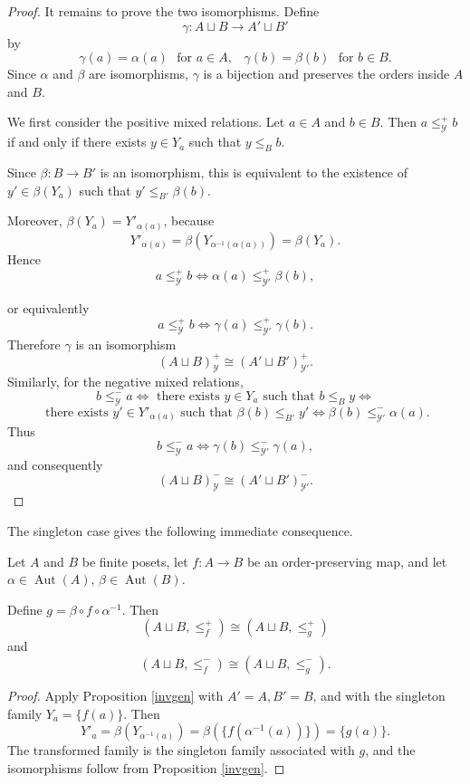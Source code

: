 \begin{proof}
    It remains to prove the two isomorphisms. Define \[\gamma \colon A \sqcup B \to A' \sqcup B'\] by \[\gamma(a)=\alpha(a) \,\, \text{ for } a \in A, \,\,\,\,\, \gamma(b)=\beta(b) \,\, \text{ for } b \in B.\]
    Since $\alpha$ and $\beta$ are isomorphisms, $\gamma$ is a bijection and preserves the orders inside $A$ and $B$. 

    We first consider the positive mixed relations. Let $a \in A$ and $b \in B$. Then $a \leq^+_{\mathcal{Y}}b$ if and only if there exists $y \in Y_a$ such that $y \leq_B b$.

    Since $\beta \colon B \to B'$ is an isomorphism, this is equivalent to the existence of $y' \in \beta( Y_a)$ such that $y' \leq_{B'} \beta(b)$.

    Moreover, $\beta(Y_a)=Y'_{\alpha(a)}$, because \[Y'_{\alpha(a)}=\beta(Y_{\alpha^{-1}(\alpha(a))})=\beta(Y_a).\]
    Hence \[a \leq_{\mathcal{Y}}^+b \iff \alpha(a) \leq^+_{\mathcal{Y}'} \beta(b),\]

    or equivalently \[a \leq^+_{\mathcal{Y}}b \iff \gamma(a) \leq^+_{\mathcal{Y}'} \gamma (b).\]
    Therefore $\gamma$ is an isomorphism 
    \[(A \sqcup B)^+_{\mathcal{Y}} \cong (A' \sqcup B')^+_{\mathcal{Y}'}.\] 
    Similarly, for the negative mixed relations, \[b \leq_{\mathcal{Y}}^-a \iff \text{ there exists } y \in Y_a \text{ such that } b \leq_B y \iff\] \[ \text{ there exists } y' \in Y'_{\alpha(a)} \text{ such that } \beta (b) \leq_{B'} y' \iff \beta (b) \leq^-_{\mathcal{
    Y'}} \alpha(a).\] 
    Thus \[b \leq^-_{\mathcal{
    Y}}a \iff \gamma (b) \leq ^- _{\mathcal{
    Y}'} \gamma (a),\] and consequently \[(A \sqcup B)^-_{\mathcal{Y}} \cong (A' \sqcup B')^-_{\mathcal{Y}'}.\]
\end{proof}

The singleton case gives the following immediate consequence.
\begin{corollary}
    Let $A$ and $B$ be finite posets, let $f \colon A \to B$ be an order-preserving map, and let $\alpha \in \operatorname{Aut}(A)$, $\beta \in \operatorname{Aut}(B)$. 

    Define $g=\beta \circ f \circ \alpha^{-1}$. Then
    \[(A \sqcup B, \leq_f^+)\cong (A \sqcup B, \leq_g^+)\] and 
    \[(A \sqcup B, \leq_f^-) \cong (A \sqcup B, \leq_g^-).\]
\end{corollary}
\begin{proof}
    Apply Proposition \ref{invgen} with $A'=A, B'=B$, and with the singleton family $Y_a=\{f(a)\}$. Then
    \[Y'_a=\beta(Y_{\alpha^{-1}(a)})=\beta(\{f(\alpha^{-1}(a))\})=\{g(a)\}.\] The transformed family is the singleton family associated with $g$, and the isomorphisms follow from Proposition \ref{invgen}.
\end{proof}


